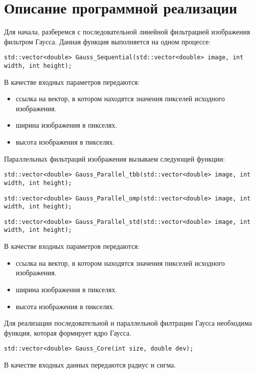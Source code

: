 \documentclass{report}
\begin{document}
\section*{Описание программной реализации}
Для начала, разберемся с последовательной линейной фильтрацией изображения фильтром Гаусса. Данная функция выполняется на одном процессе:
\begin{lstlisting}
std::vector<double> Gauss_Sequential(std::vector<double> image, int width, int height);
\end{lstlisting}
\par В качестве входных параметров передаются:
\begin{itemize}
\item ссылка на вектор, в котором находятся значения пикселей исходного изображения.
\item ширина изображения в пикселях.
\item высота изображения в пикселях.
\end{itemize}
\par Параллельных фильтраций изображения вызываем следующей функции:
\begin{lstlisting}
std::vector<double> Gauss_Parallel_tbb(std::vector<double> image, int width, int height);
\end{lstlisting}
\begin{lstlisting}
std::vector<double> Gauss_Parallel_omp(std::vector<double> image, int width, int height);
\end{lstlisting}
\begin{lstlisting}
std::vector<double> Gauss_Parallel_std(std::vector<double> image, int width, int height);
\end{lstlisting}
\par В качестве входных параметров передаются:
\begin{itemize}
\item ссылка на вектор, в котором находятся значения пикселей исходного изображения.
\item ширина изображения в пикселях.
\item высота изображения в пикселях.
\end{itemize}
\par Для реализации последовательной и параллельной филтрации Гаусса необходима функция, которая формирует ядро Гаусса.
\begin{lstlisting}
std::vector<double> Gauss_Core(int size, double dev);
\end{lstlisting}
\par В качестве входных данных передаются радиус и сигма.
\newpage
\end{document}
